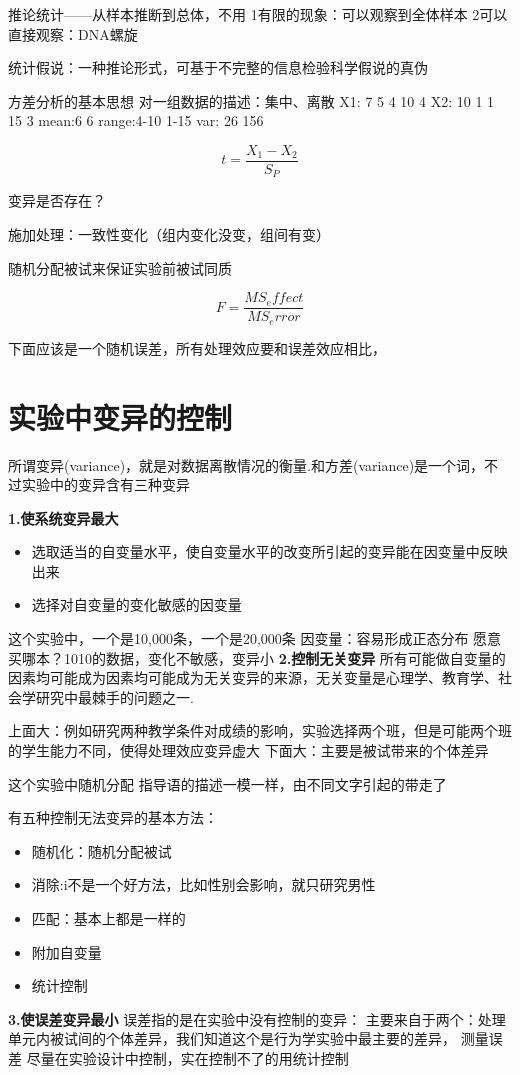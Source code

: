 推论统计——从样本推断到总体，不用
1有限的现象：可以观察到全体样本
2可以直接观察：DNA螺旋

统计假说：一种推论形式，可基于不完整的信息检验科学假说的真伪

方差分析的基本思想
对一组数据的描述：集中、离散
X1: 7 5 4 10 4
X2: 10 1 1 15 3
mean:6 6
range:4-10 1-15
var: 26 156

$$
	t=\frac{X_1-X_2}{S_P}
$$

变异是否存在？

施加处理：一致性变化（组内变化没变，组间有变）

随机分配被试来保证实验前被试同质

$$
	F=\frac{MS_effect}{MS_error}
$$

下面应该是一个随机误差，所有处理效应要和误差效应相比，



\section{实验中变异的控制}
所谓变异(variance)，就是对数据离散情况的衡量.和方差(variance)是一个词，不过实验中的变异含有三种变异

\textbf{1.使系统变异最大}
	\begin{itemize}
		\item 选取适当的自变量水平，使自变量水平的改变所引起的变异能在因变量中反映出来
		\item 选择对自变量的变化敏感的因变量
	\end{itemize}

这个实验中，一个是10,000条，一个是20,000条
因变量：容易形成正态分布
愿意买哪本？1010的数据，变化不敏感，变异小
\textbf{2.控制无关变异}
所有可能做自变量的因素均可能成为因素均可能成为无关变异的来源，无关变量是心理学、教育学、社会学研究中最棘手的问题之一.

上面大：例如研究两种教学条件对成绩的影响，实验选择两个班，但是可能两个班的学生能力不同，使得处理效应变异虚大
下面大：主要是被试带来的个体差异

这个实验中随机分配
指导语的描述一模一样，由不同文字引起的带走了

有五种控制无法变异的基本方法：

\begin{itemize}
	\item 随机化：随机分配被试
	\item 消除:i不是一个好方法，比如性别会影响，就只研究男性
	\item 匹配：基本上都是一样的
	\item 附加自变量
	\item 统计控制
\end{itemize}
\textbf{3.使误差变异最小}
误差指的是在实验中没有控制的变异：
主要来自于两个：处理单元内被试间的个体差异，我们知道这个是行为学实验中最主要的差异，
测量误差
尽量在实验设计中控制，实在控制不了的用统计控制 

